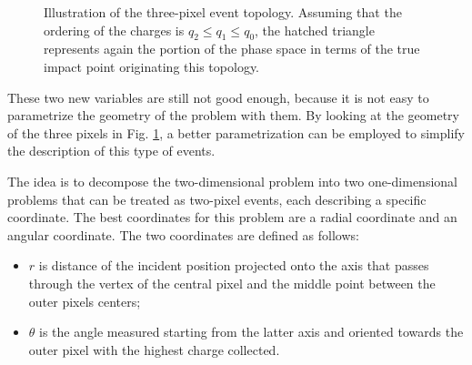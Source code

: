 \begin{figure}[!b]
    \centering
    \caption{Illustration of the three-pixel event topology. Assuming that the ordering
    of the charges is $q_2 \leq q_1 \leq q_0$, the hatched triangle represents again the 
    portion of the phase space in terms of the true impact point originating this topology.}
    \label{fig:three_pixel_event}
\end{figure}

These two new variables are still not good enough, because it is not easy to parametrize the geometry of the problem with them. By looking at the geometry of the three pixels in Fig. \ref{fig:three_pixel_event}, a better parametrization can be employed to simplify the description of this type of events.

The idea is to decompose the two-dimensional problem into two one-dimensional problems that can be treated as two-pixel events, each describing a specific coordinate. The best coordinates for this problem 
are a radial coordinate and an angular coordinate. The two coordinates are defined as follows:
\begin{itemize}[label=-]
\item $r$ is distance of the incident position projected onto the axis that passes through the vertex of the central pixel and the middle point between the outer pixels centers;
\item $\theta$ is the angle measured starting from the latter axis and oriented towards the outer pixel with the highest charge collected.
\end{itemize}

